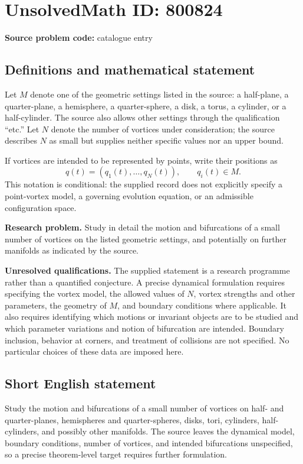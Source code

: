 \documentclass[11pt]{article}
\begin{document}
\section*{UnsolvedMath ID: 800824}
\textbf{Source problem code:} catalogue entry
\subsection{Definitions and mathematical statement}
Let \(M\) denote one of the geometric settings listed in the source: a half-plane, a quarter-plane, a hemisphere, a quarter-sphere, a disk, a torus, a cylinder, or a half-cylinder. The source also allows other settings through the qualification ``etc.'' Let \(N\) denote the number of vortices under consideration; the source describes \(N\) as small but supplies neither specific values nor an upper bound.

If vortices are intended to be represented by points, write their positions as
\[
q(t)=(q_1(t),\ldots,q_N(t)),\qquad q_i(t)\in M.
\]
This notation is conditional: the supplied record does not explicitly specify a point-vortex model, a governing evolution equation, or an admissible configuration space.

\textbf{Research problem.} Study in detail the motion and bifurcations of a small number of vortices on the listed geometric settings, and potentially on further manifolds as indicated by the source.

\textbf{Unresolved qualifications.} The supplied statement is a research programme rather than a quantified conjecture. A precise dynamical formulation requires specifying the vortex model, the allowed values of \(N\), vortex strengths and other parameters, the geometry of \(M\), and boundary conditions where applicable. It also requires identifying which motions or invariant objects are to be studied and which parameter variations and notion of bifurcation are intended. Boundary inclusion, behavior at corners, and treatment of collisions are not specified. No particular choices of these data are imposed here.
\subsection{Short English statement}
Study the motion and bifurcations of a small number of vortices on half- and quarter-planes, hemispheres and quarter-spheres, disks, tori, cylinders, half-cylinders, and possibly other manifolds. The source leaves the dynamical model, boundary conditions, number of vortices, and intended bifurcations unspecified, so a precise theorem-level target requires further formulation.
\end{document}
